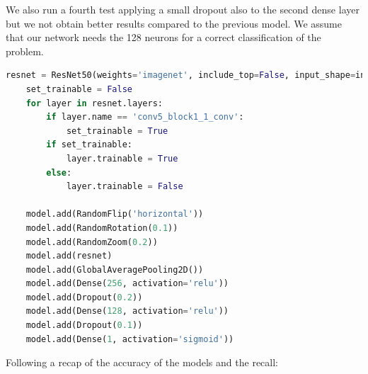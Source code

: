 We also run a fourth test applying a small dropout also to the second dense layer but we not obtain better results compared to the previous model. We assume that our network needs the 128 neurons for a correct classification of the problem. 
\begin{lstlisting}[language=python, caption={ResNet50 Fourth test}, label={lst:resnet50CodeFourthTest}]
    resnet = ResNet50(weights='imagenet', include_top=False, input_shape=input_shape)
    set_trainable = False
    for layer in resnet.layers:
        if layer.name == 'conv5_block1_1_conv':
            set_trainable = True
        if set_trainable:
            layer.trainable = True
        else:
            layer.trainable = False

    model.add(RandomFlip('horizontal'))
    model.add(RandomRotation(0.1))
    model.add(RandomZoom(0.2))
    model.add(resnet)
    model.add(GlobalAveragePooling2D())
    model.add(Dense(256, activation='relu'))
    model.add(Dropout(0.2))
    model.add(Dense(128, activation='relu'))
    model.add(Dropout(0.1))
    model.add(Dense(1, activation='sigmoid'))
\end{lstlisting}


Following a recap of the accuracy of the models and the recall:

\begin{table}[!h]
    \centering
    \caption{ResNet accuracy and recall}
    \label{tab:ResNet50}
    \end{table}

